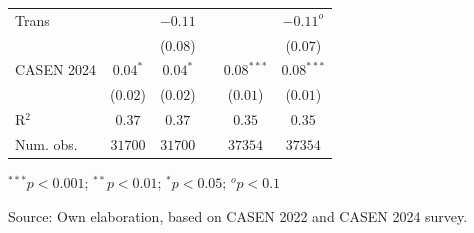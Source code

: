 \begin{table}[H]
\begin{center}
\begin{threeparttable}
\begin{tabular}{lccccc}
Trans & & $-0.11$ & & & $-0.11^{o}$ \\ 
 & & ($0.08$) & & & ($0.07$) \\ 
CASEN 2024 & $0.04^{*}$& $0.04^{*}$ & & $0.08^{***}$& $0.08^{***}$ \\ 
 & ($0.02$)& ($0.02$) & & ($0.01$)& ($0.01$) \\ 
R$^2$ & $0.37$& $0.37$ & & $0.35$& $0.35$ \\ 
Num. obs. & $31700$& $31700$ & & $37354$& $37354$ \\ \bottomrule
\end{tabular}
\begin{tablenotes}
\item ${}^{***}p<0.001$; ${}^{**}p<0.01$; ${}^{*}p<0.05$; ${}^{o}p<0.1$
\item Source: Own elaboration, based on CASEN 2022 and CASEN 2024 survey.
\end{tablenotes}
\end{threeparttable}
\end{center}
\end{table}